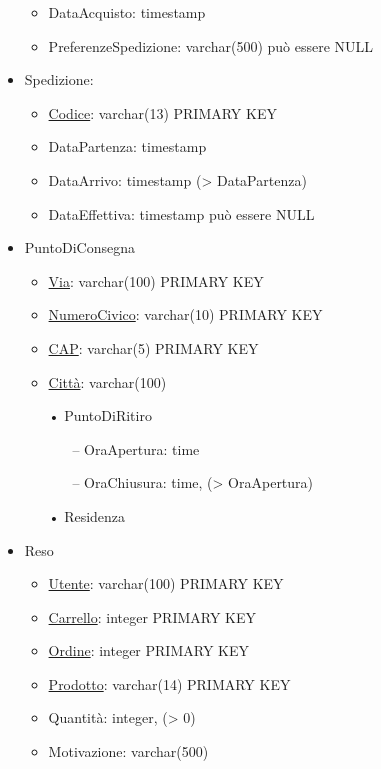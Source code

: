 \documentclass[11pt]{article}
\begin{document}
\begin{itemize}
\begin{itemize}
        \item DataAcquisto: timestamp
        \item PreferenzeSpedizione: varchar(500) può essere NULL
    \end{itemize}
    \item Spedizione:
    \begin{itemize}
        \item \underline{Codice}: varchar(13) PRIMARY KEY
        \item DataPartenza: timestamp
        \item DataArrivo: timestamp (\textgreater{} DataPartenza)
        \item DataEffettiva: timestamp può essere NULL
    \end{itemize}
    \item PuntoDiConsegna
    \begin{itemize}
        \item \underline{Via}: varchar(100) PRIMARY KEY
        \item \underline{NumeroCivico}: varchar(10) PRIMARY KEY
        \item \underline{CAP}: varchar(5) PRIMARY KEY
        \item \underline{Città}: varchar(100)
        \item[•] PuntoDiRitiro
        \begin{itemize}
            \item[–] OraApertura: time
            \item[–] OraChiusura: time, (\textgreater{} OraApertura)
        \end{itemize}
        \item[•] Residenza
    \end{itemize}
    \item Reso
    \begin{itemize}
        \item \underline{Utente}: varchar(100) PRIMARY KEY
        \item \underline{Carrello}: integer PRIMARY KEY
        \item \underline{Ordine}: integer PRIMARY KEY
        \item \underline{Prodotto}: varchar(14) PRIMARY KEY
        \item Quantità: integer, (\textgreater{} 0)
        \item Motivazione: varchar(500)
    \end{itemize}
\end{itemize}
\end{document}

